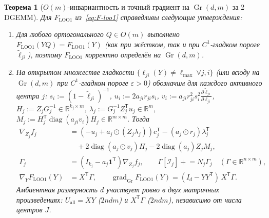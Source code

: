 \documentclass[11pt,a4paper]{article}
\numberwithin{equation}{section}
\newtheorem{theorem}{Теорема}[section]
\theoremstyle{definition}
\theoremstyle{remark}
\newcommand{\R}{\mathbb{R}}
\newcommand{\diag}{\operatorname{diag}}
\newcommand{\Gr}{\operatorname{Gr}}
\newcommand{\T}{^{\mathsf T}}
\begin{document}
\begin{theorem}[$O(m)$-инвариантность и точный градиент на $\Gr(d,m)$ за 2 DGEMM]
\label{thm:grad}
Для $F_{\mathrm{LOO1}}$ из~\eqref{eq:F-loo1} справедливы следующие утверждения:
\begin{enumerate}[label=(\alph*)]
  \item Для любого ортогонального $Q \in O(m)$ выполнено $F_{\mathrm{LOO1}}(Y Q) = F_{\mathrm{LOO1}}(Y)$
  (как при жёстком, так и при $C^1$-гладком пороге $\tilde\ell_{ji}$), поэтому $F_{\mathrm{LOO1}}$
  корректно определён на $\Gr(d, m)$.
  \item На открытом множестве гладкости $\{\ell_{ji}(Y) \ne \ell_{\max}\ \forall j, i\}$ (или всюду на $\Gr(d,m)$
  при $C^1$-гладком пороге $\varepsilon > 0$) обозначим для каждого активного центра $j$:
  $s_i := (1 - \tilde\ell_{ji})^{-1}$, $u_i := 2 a_{ji} r_{ji} s_i$,
  $v_i := a_{ji} r_{ji}^2 s_i^2 \frac{\partial \tilde\ell_{ji}}{\partial \ell_{ji}}$,
  $H_j := Z_j G_j^{-1} \in \R^{k_j \times m}$,
  $\lambda_j := G_j^{-1} Z_j\T u_j \in \R^m$,
  $M_j := H_j\T \diag(a_{ji} v_i) H_j \in \R^{m \times m}$.
  Тогда
  \begin{align}
    \nabla_{Z_j} f_j &= (-u_j + a_j \odot (Z_j \lambda_j)) c_j\T - (a_j \odot r_j) \lambda_j\T \nonumber\\
                     &\quad + 2 \diag(a_j \odot v_j) H_j - 2 \diag(a_j) Z_j M_j, \label{eq:dZ}\\
    \Gamma_j &= (I_{k_j} - a_j \mathbf{1}\T) \nabla_{Z_j} f_j, \qquad
    \Gamma[\mathcal{I}_j] \mathrel{+}= N_j \Gamma_j \quad (\Gamma \in \R^{n \times m}), \label{eq:Gamma}\\
    \nabla_Y F_{\mathrm{LOO1}}(Y) &= X\T \Gamma, \qquad
    \operatorname{grad}_{\Gr} F_{\mathrm{LOO1}}(Y) = (I_d - Y Y\T)\, X\T \Gamma. \label{eq:grad-Y}
  \end{align}
  Амбиентная размерность $d$ участвует ровно в двух матричных произведениях: $U_{\mathrm{all}} = X Y$ ($2ndm$)
  и $X\T \Gamma$ ($2ndm$), независимо от числа центров $J$.
\end{enumerate}
\end{theorem}
\end{document}
